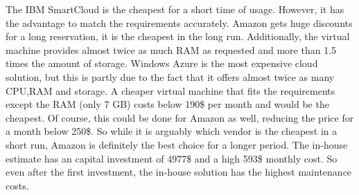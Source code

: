 \documentclass[paper=a4, fontsize=11pt]{scrartcl} %
\numberwithin{equation}{section} %
\numberwithin{figure}{section} %
\numberwithin{table}{section} %
\begin{document}
The IBM SmartCloud is the cheapest for a short time of usage. However, it has the advantage to match the requirements accurately. Amazon gets huge discounts for a long reservation, it is the cheapest in the long run. Additionally, the virtual machine provides almost twice as much RAM as requested and more than 1.5 times the amount of storage. Windows Azure is the most expensive cloud solution, but this is partly due to the fact that it offers almost twice as many CPU,RAM and storage. A cheaper virtual machine that fits the requirements except the RAM (only 7 GB) costs below 190\$ per month and would be the cheapest. Of course, this could be done for Amazon as well, reducing the price for a month below 250\$. So while it is arguably which vendor is the cheapest in a short run, Amazon is definitely the best choice for a longer period. The in-house estimate has an capital investment of 4977\$ and a high 593\$ monthly cost. So even after the first investment, the in-house solution has the highest maintenance costs.
\end{document}
